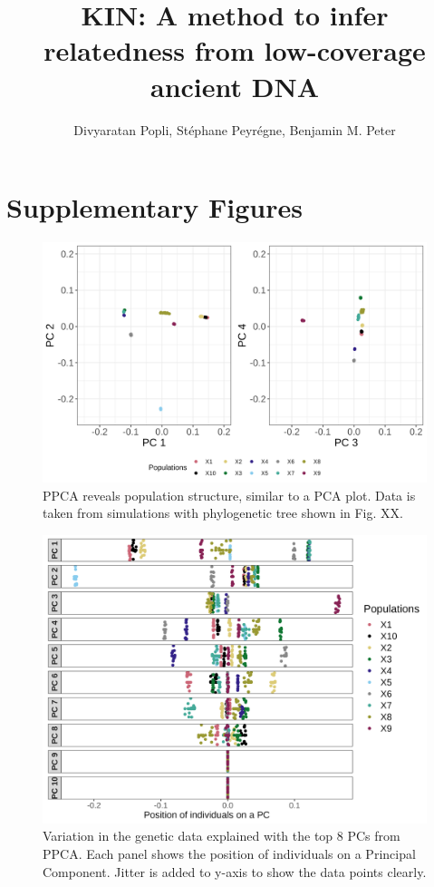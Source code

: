 \documentclass[12pt, letterpaper]{article}
\title{KIN: A method to infer relatedness from low-coverage ancient DNA}
\author{Divyaratan Popli, Stéphane Peyrégne, Benjamin M. Peter}
\begin{document}
\maketitle
\section*{Supplementary Figures}
\renewcommand{\figurename}{Fig S}

\begin{figure}[ht!]
    \includegraphics[width=16.5cm]{plots/supplementary/pcplot1.png}
    \centering
    \caption{PPCA reveals population structure, similar to a PCA plot. Data is taken from simulations with phylogenetic tree shown in Fig. XX.}
    \label{figS1:pc_scale}
\end{figure}


\begin{figure}[ht!]
    \includegraphics[width=16.5cm]{plots/supplementary/pcplot2.png}
    \centering
    \caption{Variation in the genetic data explained with the top 8 PCs from PPCA. Each panel shows the position of individuals on a Principal Component. Jitter is added to y-axis to show the data points clearly.}
    \label{figS1:pc_scale}
\end{figure}
\end{document}
